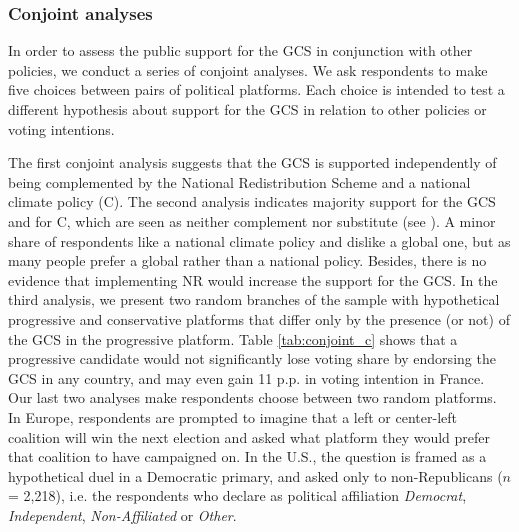 \documentclass[12pt,english]{article}
\begin{document}
\subsubsection{Conjoint analyses}\label{subsubsec:conjoint} %

In order to assess the public support for the GCS in conjunction with other policies, we conduct a series of conjoint analyses. We ask respondents to make five choices between pairs of political platforms. Each choice is intended to test a different hypothesis about support for the GCS in relation to other policies or voting intentions.

The first conjoint analysis suggests that the GCS is supported independently of being complemented by the National Redistribution Scheme and a national climate policy (C). %
The second analysis indicates majority support for the GCS and for C, which are seen as neither complement nor substitute (see ). A minor share of respondents like a national climate policy and dislike a global one, but as many people prefer a global rather than a national policy. Besides, there is no evidence that implementing NR would increase the support for the GCS.
In the third analysis, we present two random branches of the sample with hypothetical progressive and conservative platforms that differ only by the presence (or not) of the GCS in the progressive platform. Table \ref{tab:conjoint_c} shows that a progressive candidate would not significantly lose voting share by endorsing the GCS in any country, and may even gain 11 p.p. in voting intention in France. %
Our last two analyses make respondents choose between two random platforms. In Europe, respondents are prompted to imagine that a left or center-left coalition will win the next election and asked what platform they would prefer that coalition to have campaigned on. In the U.S., the question is framed as a hypothetical duel in a Democratic primary, and asked only to non-Republicans ($n$ = 2,218), i.e. the respondents who declare as political affiliation \textit{Democrat}, \textit{Independent}, \textit{Non-Affiliated} or \textit{Other}. 
\end{document}
